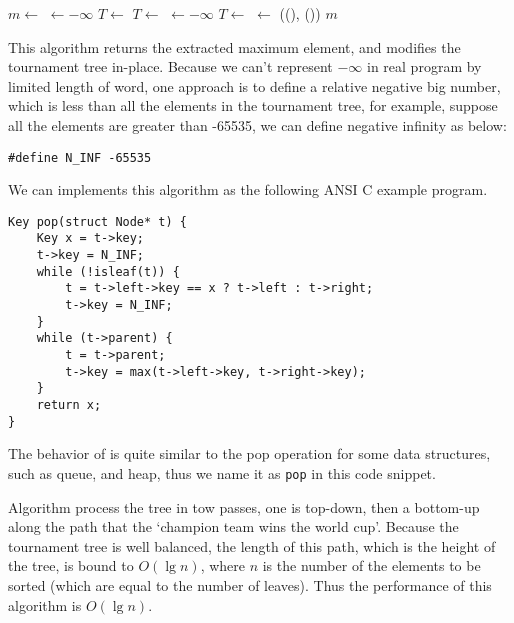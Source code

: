 \documentclass{article}
\begin{document}
\begin{algorithmic}
  \State $m \gets$ 
  \State {} $\gets -\infty$
    
      \State $T \gets$ 
    \Else
      \State $T \gets$ 
    \EndIf
    \State {} $\gets -\infty$
  \EndWhile
   
    \State $T \gets$ 
    \State {} $\gets$ ((), ())
  \EndWhile
  \State \Return $m$
\EndFunction
\end{algorithmic}

This algorithm returns the extracted maximum element, and modifies the tournament tree in-place.
Because we can't represent $-\infty$ in real program by limited length of word, one approach is to define
a relative negative big number, which is less than all the elements in the tournament tree, for example,
suppose all the elements are greater than -65535, we can define negative infinity as below:

\lstset{language=C}
\begin{lstlisting}
#define N_INF -65535
\end{lstlisting}

We can implements this algorithm as the following ANSI C example program.

\lstset{language=C}
\begin{lstlisting}
Key pop(struct Node* t) {
    Key x = t->key;
    t->key = N_INF;
    while (!isleaf(t)) {
        t = t->left->key == x ? t->left : t->right;
        t->key = N_INF;
    }
    while (t->parent) {
        t = t->parent;
        t->key = max(t->left->key, t->right->key);
    }
    return x;
}
\end{lstlisting}

The behavior of  is quite similar to the pop operation for some data structures,
such as queue, and heap, thus we name it as \texttt{pop} in this code snippet.

Algorithm  process the tree in tow passes, one is top-down, then a bottom-up along
the path that the `champion team wins the world cup'.
Because the tournament tree is well balanced,
the length of this path, which is the height of the tree, is bound to $O(\lg n)$,
where $n$ is the number of the elements to be sorted (which are equal to the number of leaves).
Thus the performance of this algorithm is $O(\lg n)$.
\end{document}
